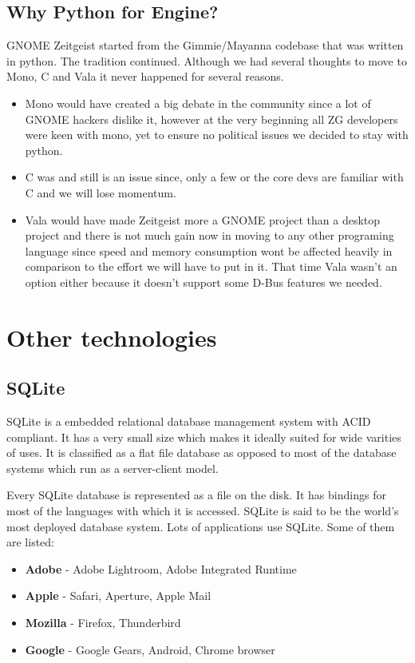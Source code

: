 \subsection{Why Python for Engine?}
GNOME Zeitgeist started from the Gimmie/Mayanna codebase that was written 
in python. The tradition continued. Although we had several thoughts to move 
to Mono, C and Vala it never happened for several reasons. 
\begin{itemize}
\item Mono would have created a big debate in the community since a lot of 
GNOME hackers dislike it, however at the very beginning all ZG developers were 
keen with mono, yet to ensure no political issues we decided to stay with python.
\item C was and still is an issue since, only a few or the core devs are familiar 
with C and we will lose momentum.
\item Vala would have made Zeitgeist more a GNOME project than a desktop project 
and there is not much gain now in moving to any other programing language since 
speed and memory consumption wont be affected heavily in comparison to the effort 
we will have to put in it. That time Vala wasn't an option either because it 
doesn't support some D-Bus features we needed.
\end{itemize}


\section{Other technologies}
\subsection{SQLite}
SQLite is a embedded relational database management system with ACID compliant. It 
has a very small size which makes it ideally suited for wide varities of uses. It is 
classified as a flat file database as opposed to most of the database systems which 
run as a server-client model.

Every SQLite database is represented as a file on the disk. It has bindings for most 
of the languages with which it is accessed. SQLite is said to be the world's most 
deployed database system. Lots of applications use SQLite. Some of them are listed: 
\begin{itemize}
\item \textbf{Adobe} - Adobe Lightroom, Adobe Integrated Runtime
\item \textbf{Apple} - Safari, Aperture, Apple Mail
\item \textbf{Mozilla} - Firefox, Thunderbird
\item \textbf{Google} - Google Gears, Android, Chrome browser
\end{itemize}


